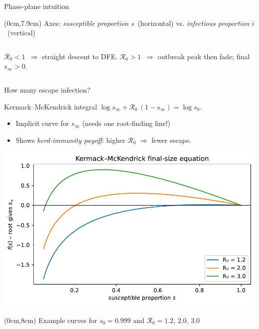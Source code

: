 \documentclass[14pt,aspectratio=169]{beamer}
\newcommand{\RR}{\mathcal{R}_0}
\begin{document}
\begin{frame}{Phase-plane intuition}
  \begin{textblock*}{\textwidth}(0cm,7.9cm)
    {\scriptsize Axes: \emph{susceptible proportion $s$} (horizontal) vs. \emph{infectious proportion $i$} (vertical)}
  \end{textblock*}
  \vspace{-0.15em}
  \begin{columns}[onlytextwidth]
      $\RR<1$ $\Rightarrow$ straight descent to DFE.
      $\RR>1$ $\Rightarrow$ outbreak peak then fade; final $s_\infty>0$.
  \end{columns}
\end{frame}

\begin{frame}{How many escape infection?}
  \begin{block}{Kermack–McKendrick integral}
    $\displaystyle \log s_\infty + \RR\,(1-s_\infty)=\log s_0$.
  \end{block}
  \begin{itemize}
    \item Implicit curve for $s_\infty$ (needs one root‑finding line!)
    \item Shows \emph{herd‑immunity payoff}: higher $\RR$ $\Rightarrow$ fewer escape.
  \end{itemize}
  \centering
  \includegraphics{FinalSizeSketch.pdf}
  \begin{textblock*}{\textwidth}(0cm,8cm)
    {\scriptsize Example curves for $s_0=0.999$ and $\RR=1.2,\,2.0,\,3.0$}
  \end{textblock*}
\end{frame}
\end{document}
